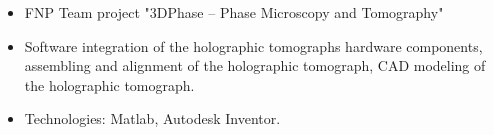 \documentclass[10pt,a4paper,ragged2e,withhyper]{altacv}
\begin{document}
\begin{paracol}{2}
\begin{itemize}
\item FNP Team project "3DPhase -- Phase Microscopy and Tomography"
\item Software integration of the holographic tomographs hardware components, assembling and alignment of the holographic tomograph, CAD modeling of the holographic tomograph.
\item Technologies: Matlab, Autodesk Inventor.
\end{itemize}






\newpage


\nocite{*}

\printbibliography[heading=pubtype,title={\printinfo{\faBook}{Books}},type=book]

\divider

\printbibliography[heading=pubtype,title={\printinfo{\faFile*[regular]}{Journal Articles}}, type=article]


\end{paracol}
\end{document}
